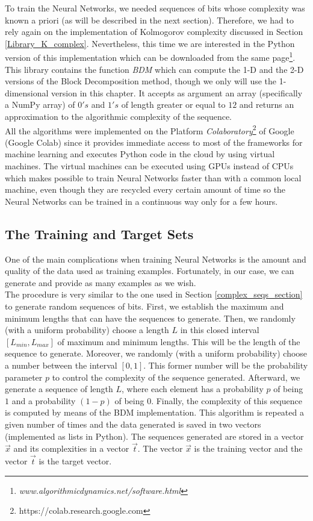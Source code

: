 To train the Neural Networks, we needed sequences of bits whose complexity was known a priori (as will be described in the next section). Therefore, we had to rely again on the implementation of Kolmogorov complexity discussed in Section \ref{Library_K_complex}. Nevertheless, this time we are interested in the Python version of this implementation which can be downloaded from the same page\footnote{\textit{www.algorithmicdynamics.net/software.html}}. This library contains the function \textit{BDM} which can compute the 1-D and the 2-D versions of the Block Decomposition method, though we only will use the 1-dimensional version in this chapter. It accepts as argument an array (specifically a NumPy array) of $0's$ and $1's$ of length greater or equal to $12$ and returns an approximation to the algorithmic complexity of the sequence.\\

All the algorithms were implemented on the Platform \textit{Colaboratory}\footnote{https://colab.research.google.com} of Google (Google Colab) since it provides immediate access to most of the frameworks for machine learning and executes Python code in the cloud by using virtual machines. The virtual machines can be executed using GPUs instead of CPUs which makes possible to train Neural Networks faster than with a common local machine, even though they are recycled every certain amount of time so the Neural Networks can be trained in a continuous way only for a few hours.\\

\subsection{The Training and Target Sets}
One of the main complications when training Neural Networks is the amount and quality of the data used as training examples. Fortunately, in our case, we can generate and provide as many examples as we wish.\\

The procedure is very similar to the one used in Section \ref{complex_seqs_section} to generate random sequences of bits. First, we establish the maximum and minimum lengths that can have the sequences to generate. Then, we randomly (with a uniform probability) choose a length $L$ in this closed interval $[L_{min},L_{max}]$ of maximum and minimum lengths. This will be the length of the sequence to generate. Moreover, we randomly (with a uniform probability) choose a number between the interval $[0,1]$. This former number will be the probability parameter $p$ to control the complexity of the sequence generated. Afterward, we generate a sequence of length $L$, where each element has a probability $p$ of being $1$ and a probability $(1-p)$ of being $0$. Finally, the complexity of this sequence is computed by means of the BDM implementation. This algorithm is repeated a given number of times and the data generated is saved in two vectors (implemented as lists in Python). The sequences generated are stored in a vector $\vec{x}$ and its complexities in a vector $\vec{t}$. The vector $\vec{x}$ is the training vector and the vector $\vec{t}$ is the target vector.\\

